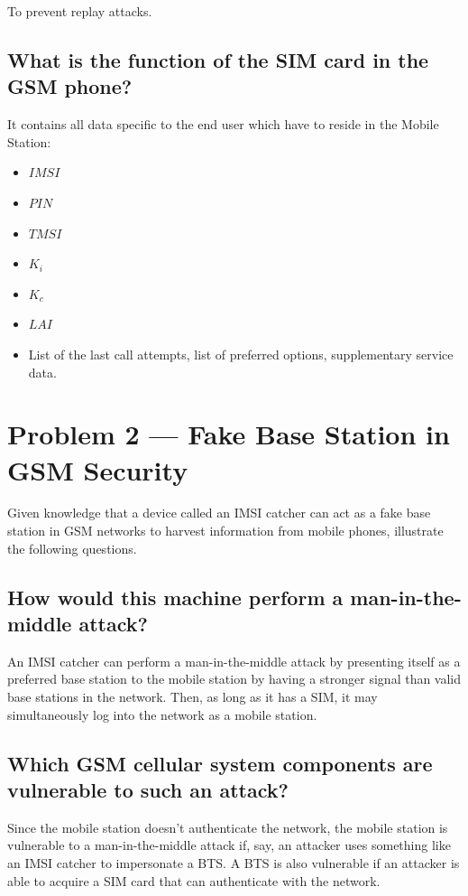 \documentclass[a4paper]{report}
\begin{document}
To prevent replay attacks.

\subsection{What is the function of the SIM card in the GSM phone?}

It contains all data specific to the end user which have to reside in the Mobile Station:

\begin{itemize}
\item $IMSI$
\item $PIN$
\item $TMSI$
\item $K_i$
\item $K_c$
\item $LAI$
\item List of the last call attempts, list of preferred options, supplementary service data. 
\end{itemize}

\section{Problem 2 --- Fake Base Station in GSM Security}

Given knowledge that a device called an IMSI catcher can act as a fake base station in GSM
networks to harvest information from mobile phones, illustrate the following questions.

\subsection{How would this machine perform a man-in-the-middle attack?}

An IMSI catcher can perform a man-in-the-middle attack by presenting itself as a preferred base
station to the mobile station by having a stronger signal than valid base stations in the network.
Then, as long as it has a SIM, it may simultaneously log into the network as a mobile station.

\subsection{Which GSM cellular system components are vulnerable to such an attack?}

Since the mobile station doesn't authenticate the network, the mobile station is vulnerable to
a man-in-the-middle attack if, say, an attacker uses something like an IMSI catcher to impersonate
a BTS. A BTS is also vulnerable if an attacker is able to acquire a SIM card that can authenticate
with the network.
\end{document}
